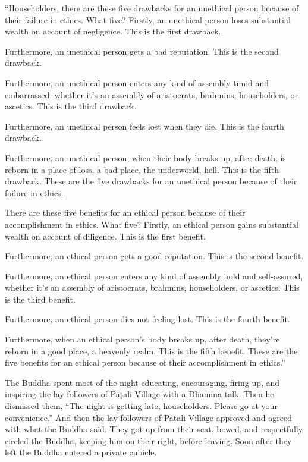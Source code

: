 \documentclass[12pt,openany]{book}%
\begin{document}
“Householders, there are these five drawbacks for an unethical person because of their failure in ethics. What five? Firstly, an unethical person loses substantial wealth on account of negligence. This is the first drawback. 

Furthermore, an unethical person gets a bad reputation. This is the second drawback. 

Furthermore, an unethical person enters any kind of assembly timid and embarrassed, whether it’s an assembly of aristocrats, brahmins, householders, or ascetics. This is the third drawback. 

Furthermore, an unethical person feels lost when they die. This is the fourth drawback. 

Furthermore, an unethical person, when their body breaks up, after death, is reborn in a place of loss, a bad place, the underworld, hell. This is the fifth drawback. These are the five drawbacks for an unethical person because of their failure in ethics. 

There are these five benefits for an ethical person because of their accomplishment in ethics. What five? Firstly, an ethical person gains substantial wealth on account of diligence. This is the first benefit. 

Furthermore, an ethical person gets a good reputation. This is the second benefit. 

Furthermore, an ethical person enters any kind of assembly bold and self-assured, whether it’s an assembly of aristocrats, brahmins, householders, or ascetics. This is the third benefit. 

Furthermore, an ethical person dies not feeling lost. This is the fourth benefit. 

Furthermore, when an ethical person’s body breaks up, after death, they’re reborn in a good place, a heavenly realm. This is the fifth benefit. These are the five benefits for an ethical person because of their accomplishment in ethics.” 

The Buddha spent most of the night educating, encouraging, firing up, and inspiring the lay followers of \textsanskrit{Pāṭali} Village with a Dhamma talk. Then he dismissed them, “The night is getting late, householders. Please go at your convenience.” And then the lay followers of \textsanskrit{Pāṭali} Village approved and agreed with what the Buddha said. They got up from their seat, bowed, and respectfully circled the Buddha, keeping him on their right, before leaving. Soon after they left the Buddha entered a private cubicle. 
\end{document}

